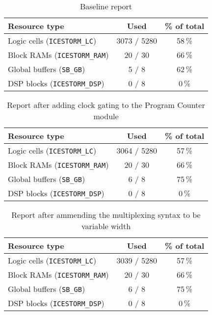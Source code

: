 \documentclass[a4paper,10pt]{article}
\begin{document}
\begin{table}[H] 
    \centering
    \begin{tabularx}{0.65\textwidth}{X c c}
        \toprule
        Resource type & Used & \% of total \\ \midrule
        Logic cells (\texttt{ICESTORM\_LC}) & 3073 / 5280 & 58\,\% \\
        Block RAMs (\texttt{ICESTORM\_RAM}) & 20 / 30 & 66\,\% \\
        Global buffers (\texttt{SB\_GB}) & 5 / 8 & 62\,\% \\
        DSP blocks (\texttt{ICESTORM\_DSP}) & 0 / 8 & 0\,\% \\
        \bottomrule
    \end{tabularx}
    \caption{Baseline report}
    \label{tab:baseline}
\end{table}

\begin{table}[H] 
    \centering
    \begin{tabularx}{0.65\textwidth}{X c c}
        \toprule
        Resource type & Used & \% of total \\ \midrule
        Logic cells (\texttt{ICESTORM\_LC}) & 3064 / 5280 & 57\,\% \\
        Block RAMs (\texttt{ICESTORM\_RAM}) & 20 / 30 & 66\,\% \\
        Global buffers (\texttt{SB\_GB}) & 6 / 8 & 75\,\% \\
        DSP blocks (\texttt{ICESTORM\_DSP}) & 0 / 8 & 0\,\% \\
        \bottomrule
    \end{tabularx}
    \caption{Report after adding clock gating to the Program Counter module}
    \label{tab:Program_Counter}
\end{table}

\begin{table}[H] 
    \centering
    \begin{tabularx}{0.65\textwidth}{X c c}
        \toprule
        Resource type & Used & \% of total \\ \midrule
        Logic cells (\texttt{ICESTORM\_LC}) & 3039 / 5280 & 57\,\% \\
        Block RAMs (\texttt{ICESTORM\_RAM}) & 20 / 30 & 66\,\% \\
        Global buffers (\texttt{SB\_GB}) & 6 / 8 & 75\,\% \\
        DSP blocks (\texttt{ICESTORM\_DSP}) & 0 / 8 & 0\,\% \\
        \bottomrule
    \end{tabularx}
    \caption{Report after ammending the multiplexing syntax to be variable width}
    \label{tab:Mux}
\end{table}
\end{document}
